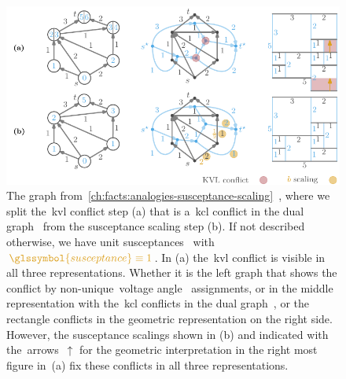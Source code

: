 \begin{figure}[t!]
    \includegraphics[page=1]{factsplacement/figures/geometric-shifting-example.pdf}
    \caption[Different interpretations for the~\gls{kvl} conflict and
    resolution.]{The graph
    from~\cref{ch:facts:analogies-susceptance-scaling}~\parencite[p.18; Figure
    18]{Fel13}, where we split the~\textcolor{KVLCONFLICT}{\gls{kvl} conflict}
    step (a) that is a~\gls{kcl} conflict in the \textcolor{DUALGRAPH}{dual
    graph~} from the susceptance scaling step (b). If not
    described otherwise, we have unit
    susceptances~\textcolor{SUSCEPTANCE}{}
    with~$\textcolor{SUSCEPTANCE}{\glssymbol{susceptance} \equiv 1}$. In (a)
    the~\textcolor{KVLCONFLICT}{\gls{kvl} conflict} is visible in all three
    representations. Whether it is the left graph that shows the conflict by
    non-unique~\textcolor{THETA}{voltage angle~}
    assignments, or in the middle representation with
    the~\textcolor{KVLCONFLICT}{\gls{kcl} conflicts} in the
    \textcolor{DUALGRAPH}{dual graph~}, or the
    \textcolor{KVLCONFLICT}{rectangle conflicts} in the geometric representation
    on the right side. However, the susceptance scalings shown in (b) and
    indicated with the~\textcolor{KITorange}{arrows~$\uparrow$} for the
    geometric interpretation in the right most figure in~(a) fix these conflicts
    in all three representations.}
    \label{ch:facts:fig:geometric-shifting-example}
\end{figure}
%   
